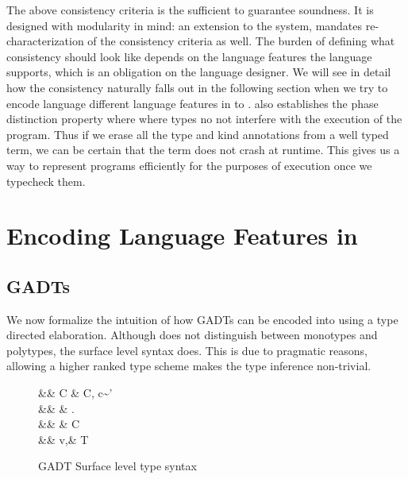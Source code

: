 \documentclass[screen,nonacm]{acmart}
\begin{document}
The above consistency criteria is the sufficient to guarantee soundness. It is designed with modularity in mind: an extension to the system, mandates re-characterization of the consistency criteria as well. The burden of defining what consistency should look like depends on the language features the language supports, which is an obligation on the language designer. We will see in detail how the consistency naturally falls out in the following section when we try to encode language different language features in to \SFC.  also establishes the phase distinction property\cite{harper_higher-order_1989} where where types no not interfere with the execution of the program. Thus if we erase all the type and kind annotations from a well typed term, we can be certain that the term does not crash at runtime. This gives us a way to represent programs efficiently for the purposes of execution once we typecheck them.

\section{Encoding Language Features in \SFC}\label{sec:sfc-encoding-features}%
\subsection{GADTs}\label{sec:fc-encodes-gadts}
We now formalize the intuition of how GADTs can be encoded into \SFC using a type directed elaboration. Although \SFC does not distinguish between monotypes and polytypes, the surface level syntax does. This is due to pragmatic reasons, allowing a higher ranked type scheme makes the type inference non-trivial\cite{jones_practical_2007}.

\begin{figure}[ht]
 \centering
 \begin{syntax}
  && C \bnfeq& \empt \bnfor C, c\co\tau\sim\tau'\\
  && \pi \bnfeq& \eta \bnfor \Forall\TyVar.\pi\\
  && \eta \bnfeq& \tau \bnfor C \then \eta\\
  && v,\tau \bnfeq& \TyVar \bnfor \tau\to\tau \bnfor T\App\many\tau
 \end{syntax}
 \caption{GADT Surface level type syntax}
 \label{fig:gadt-type-syntax}
\end{figure}
\end{document}
